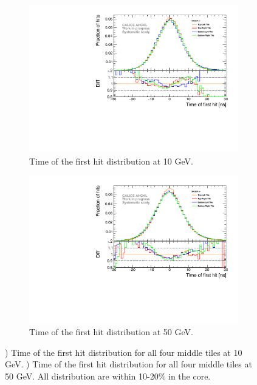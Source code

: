 \begin{figure}[htbp!]
	\begin{subfigure}[t]{0.5\textwidth}
		\centering
		\includegraphics[width=1\textwidth]{chap5/fig_AHCAL_timing/Electrons/Systematic_Inhomogeneity_10GeV.pdf}
		\caption{Time of the first hit distribution at 10 GeV.}\label{fig:timing_inhomo_10GeV}
	\end{subfigure}
	\hfill
	\begin{subfigure}[t]{0.5\textwidth}
		\centering
		\includegraphics[width=1\textwidth]{chap5/fig_AHCAL_timing/Electrons/Systematic_Inhomogeneity_50GeV.pdf}
		\caption{Time of the first hit distribution at 50 GeV.}\label{fig:timing_inhomo_50GeV}
	\end{subfigure}
	\caption{) Time of the first hit distribution for all four middle tiles at 10 GeV. ) Time of the first hit distribution for all four middle tiles at 50 GeV. All distribution are within 10-20\% in the core.}
\end{figure}

